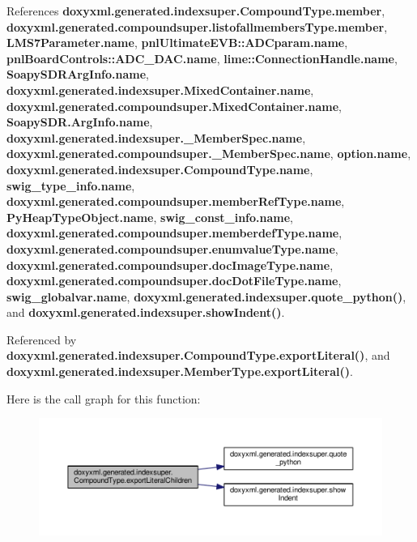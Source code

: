 References {\bf doxyxml.\+generated.\+indexsuper.\+Compound\+Type.\+member}, {\bf doxyxml.\+generated.\+compoundsuper.\+listofallmembers\+Type.\+member}, {\bf L\+M\+S7\+Parameter.\+name}, {\bf pnl\+Ultimate\+E\+V\+B\+::\+A\+D\+Cparam.\+name}, {\bf pnl\+Board\+Controls\+::\+A\+D\+C\+\_\+\+D\+A\+C.\+name}, {\bf lime\+::\+Connection\+Handle.\+name}, {\bf Soapy\+S\+D\+R\+Arg\+Info.\+name}, {\bf doxyxml.\+generated.\+indexsuper.\+Mixed\+Container.\+name}, {\bf doxyxml.\+generated.\+compoundsuper.\+Mixed\+Container.\+name}, {\bf Soapy\+S\+D\+R.\+Arg\+Info.\+name}, {\bf doxyxml.\+generated.\+indexsuper.\+\_\+\+Member\+Spec.\+name}, {\bf doxyxml.\+generated.\+compoundsuper.\+\_\+\+Member\+Spec.\+name}, {\bf option.\+name}, {\bf doxyxml.\+generated.\+indexsuper.\+Compound\+Type.\+name}, {\bf swig\+\_\+type\+\_\+info.\+name}, {\bf doxyxml.\+generated.\+compoundsuper.\+member\+Ref\+Type.\+name}, {\bf Py\+Heap\+Type\+Object.\+name}, {\bf swig\+\_\+const\+\_\+info.\+name}, {\bf doxyxml.\+generated.\+compoundsuper.\+memberdef\+Type.\+name}, {\bf doxyxml.\+generated.\+compoundsuper.\+enumvalue\+Type.\+name}, {\bf doxyxml.\+generated.\+compoundsuper.\+doc\+Image\+Type.\+name}, {\bf doxyxml.\+generated.\+compoundsuper.\+doc\+Dot\+File\+Type.\+name}, {\bf swig\+\_\+globalvar.\+name}, {\bf doxyxml.\+generated.\+indexsuper.\+quote\+\_\+python()}, and {\bf doxyxml.\+generated.\+indexsuper.\+show\+Indent()}.



Referenced by {\bf doxyxml.\+generated.\+indexsuper.\+Compound\+Type.\+export\+Literal()}, and {\bf doxyxml.\+generated.\+indexsuper.\+Member\+Type.\+export\+Literal()}.



Here is the call graph for this function\+:
\nopagebreak
\begin{figure}[H]
\begin{center}
\leavevmode
\includegraphics[width=350pt]{d6/db9/classdoxyxml_1_1generated_1_1indexsuper_1_1CompoundType_acc0c044e68f6c2fb690696a27225662a_cgraph}
\end{center}
\end{figure}





